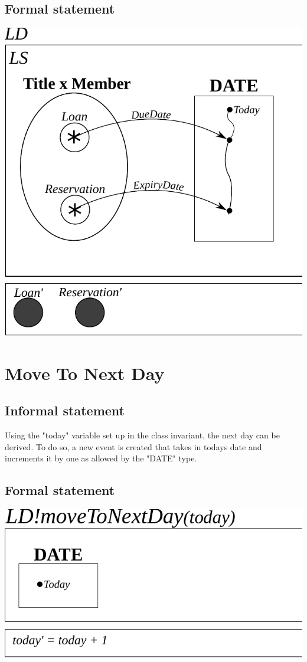 \documentclass[]{article}
\begin{document}
\subsection{Formal statement}
\begin{center}
\includegraphics[scale=0.75]{class_invariant.pdf}
\end{center}

\section{Move To Next Day}
\subsection{Informal statement}
Using the "today" variable set up in the class invariant, the next day can be derived. To do so, a new event is created that takes in todays date and increments it by one as allowed by the "DATE" type.
\subsection{Formal statement}
\begin{center}
	\includegraphics{move_to_next_day.pdf}
\end{center}
\end{document}
